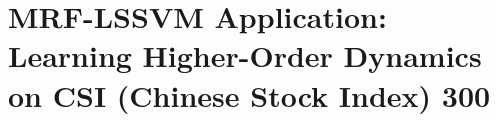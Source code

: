 
\chapter{MRF-LSSVM Application: Learning Higher-Order Dynamics on
  CSI (Chinese Stock Index) 300}
\label{cha:mrf_lssvm_app}

